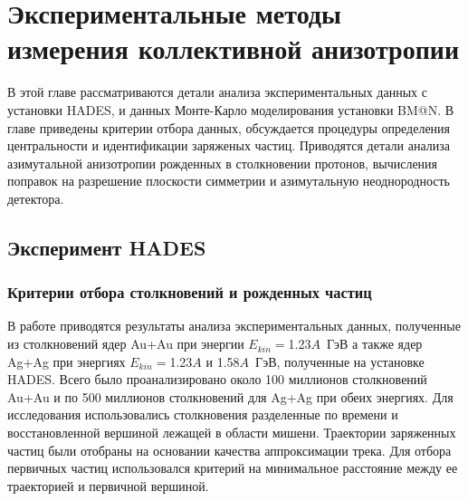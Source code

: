 \chapter{Экспериментальные методы измерения коллективной анизотропии}

В этой главе рассматриваются детали анализа экспериментальных данных с установки HADES, и данных Монте-Карло моделирования установки BM@N.
В главе приведены критерии отбора данных, обсуждается процедуры определения центральности и идентификации заряженых частиц.
Приводятся детали анализа азимутальной анизотропии рожденных в столкновении протонов, вычисления поправок на разрешение плоскости симметрии и азимутальную неоднородность детектора.

\section{Эксперимент HADES}

\subsection{Критерии отбора столкновений и рожденных частиц}

В работе приводятся результаты анализа экспериментальных данных, полученные из столкновений ядер Au+Au при энергии $E_{kin}=$1.23$A$~ГэВ а также ядер Ag+Ag при энергиях $E_{kin}=$1.23$A$ и 1.58$A$~ГэВ, полученные на установке HADES.
Всего было проанализировано около 100 миллионов столкновений Au+Au и по 500 миллионов столкновений для Ag+Ag при обеих энергиях.
Для исследования использовались столкновения разделенные по времени и восстановленной вершиной лежащей в области мишени.
Траектории заряженных частиц были отобраны на основании качества аппроксимации трека.
Для отбора первичных частиц использовался критерий на минимальное расстояние между ее траекторией и первичной вершиной. 

